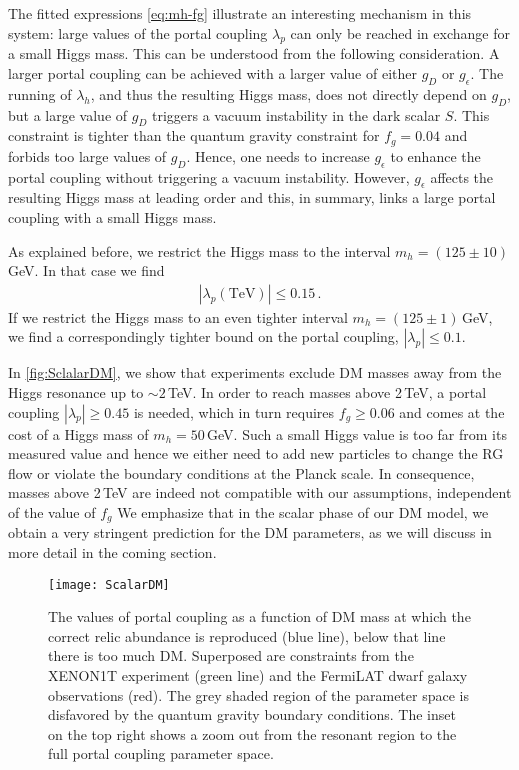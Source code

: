 \documentclass[aps,prd,twocolumn,preprintnumbers,superscriptaddress,nobibnotes,floatfix,longbibliography]{revtex4-1}
\begin{document}
The fitted expressions \eqref{eq:mh-fg} illustrate an interesting mechanism in this system:
large values of the portal coupling $\lambda_p$ can only be reached in exchange for a small Higgs mass.
This can be understood from the following consideration.
A larger portal coupling can be achieved with a larger value of either $g_D$ or $g_\epsilon$.  
The running of $\lambda_h$, and thus the resulting Higgs mass, does not directly depend on $g_D$, but a large value of $g_D$ triggers a vacuum instability in the dark scalar $S$.
This constraint is tighter than the quantum gravity constraint for $f_g=0.04$ and forbids too large values of $g_D$.
Hence, one needs to increase $g_\epsilon$ to enhance the portal coupling without triggering a vacuum instability.
However, $g_\epsilon$ affects the resulting Higgs mass at leading order
and this, in summary, links a large portal coupling with a small Higgs mass.

As explained before, we restrict the Higgs mass to the interval $m_h=(125\pm 10)$\,GeV.
In that case we find 
\begin{align}
 \label{eq:lp-max}
 |\lambda_p (\text{TeV})| \leq 0.15 \,.
\end{align}
If we restrict the Higgs mass to an even tighter interval $m_h=(125\pm 1)$\,GeV,
we find a correspondingly tighter bound on the portal coupling, $|\lambda_{p}| \leq 0.1$.

In \autoref{fig:SclalarDM}, we show that experiments exclude DM masses away from the Higgs resonance up to $\sim 2\,$TeV.
In order to reach masses above 2\,TeV, a portal coupling $|\lambda_p|\geq 0.45$ is needed,
which in turn requires $f_g\geq 0.06$ and comes at the cost of a Higgs mass of $m_h=50$\,GeV.
Such a small Higgs value is too far from its measured value and hence we either need to add new particles to change the RG flow or violate the boundary conditions at the Planck scale.
In consequence, masses above 2\,TeV are indeed not compatible with our assumptions, independent of the value of $f_g$
We emphasize that in the scalar phase of our DM model, we obtain a very stringent prediction for the DM parameters, as we will discuss in more detail in the coming section.

\begin{figure}[t]
\texttt{[image: ScalarDM]}
\caption{The values of portal coupling as a function of DM mass at which the correct relic abundance is reproduced (blue line), below that line there is too much DM. Superposed are constraints from the XENON1T experiment (green line) and the FermiLAT dwarf galaxy observations (red). The grey shaded region of the parameter space is disfavored by the quantum gravity boundary conditions. The inset on the top right shows a zoom out from the resonant region to the full portal coupling parameter space.
}
\label{fig:SclalarDM}
\end{figure}
\end{document}
